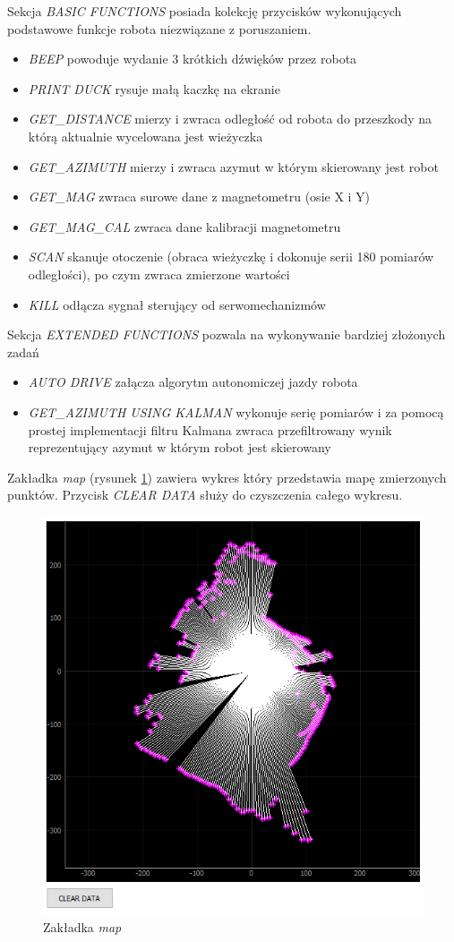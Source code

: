 Sekcja \emph{BASIC FUNCTIONS} posiada kolekcję przycisków wykonujących podstawowe funkcje robota niezwiązane z poruszaniem.
\begin{itemize}
    \item \emph{BEEP} powoduje wydanie 3 krótkich dźwięków przez robota
    \item \emph{PRINT DUCK} rysuje małą kaczkę na ekranie
    \item \emph{GET\_DISTANCE} mierzy i zwraca odległość od robota do przeszkody na którą aktualnie wycelowana jest wieżyczka
    \item \emph{GET\_AZIMUTH} mierzy i zwraca azymut w którym skierowany jest robot
    \item \emph{GET\_MAG} zwraca surowe dane z magnetometru (osie X i Y)
    \item \emph{GET\_MAG\_CAL} zwraca dane kalibracji magnetometru
    \item \emph{SCAN} skanuje otoczenie (obraca wieżyczkę i dokonuje serii 180 pomiarów odległości), po czym zwraca zmierzone wartości
    \item \emph{KILL} odłącza sygnał sterujący od serwomechanizmów
\end{itemize}

Sekcja \emph{EXTENDED FUNCTIONS} pozwala na wykonywanie bardziej złożonych zadań
\begin{itemize}
    \item \emph{AUTO DRIVE} załącza algorytm autonomiczej jazdy robota
    \item \emph{GET\_AZIMUTH USING KALMAN} wykonuje serię pomiarów i za pomocą prostej implementacji filtru Kalmana\cite{Kedzierski2016} zwraca przefiltrowany wynik reprezentujący azymut w którym robot jest skierowany
\end{itemize}

Zakładka \emph{map} (rysunek \ref{fig:main-app-map-section}) zawiera wykres który przedstawia mapę zmierzonych punktów. Przycisk \emph{CLEAR DATA} służy do czyszczenia całego wykresu.
\begin{figure}[ht]
	\centering
		\includegraphics[width=0.8\linewidth]{rys/main-app-view-map.PNG}
	\caption{Zakładka \emph{map}}
	\label{fig:main-app-map-section}
\end{figure}

